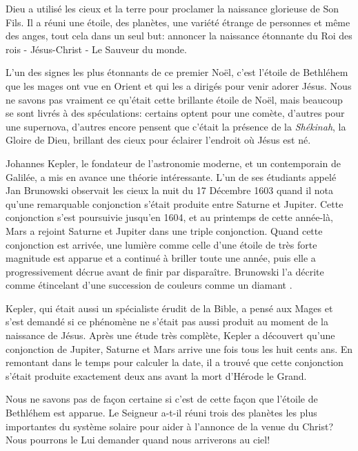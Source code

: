 


Dieu a utilisé les cieux et la terre pour proclamer la naissance glorieuse de Son Fils. Il a réuni une étoile, des planètes, une variété étrange de personnes et même des anges, tout cela dans un seul but: annoncer la naissance étonnante du Roi des rois - Jésus-Christ - Le Sauveur du monde.

L'un des signes les plus étonnants de ce premier Noël, c'est l'étoile de Bethléhem que les mages ont vue en Orient et qui les a dirigés pour venir adorer Jésus. Nous ne savons pas vraiment ce qu'était cette brillante étoile de Noël, mais beaucoup se sont livrés à des spéculations: certains optent pour une comète, d'autres pour une supernova, d'autres encore pensent que c'était la présence de la \emph{Shékinah}, la Gloire de Dieu, brillant des cieux pour éclairer l'endroit où Jésus est né.

Johannes Kepler, le fondateur de l'astronomie moderne, et un contemporain de Galilée, a mis en avance une théorie intéressante. L'un de ses étudiants appelé Jan Brunowski observait les cieux la nuit du 17 Décembre 1603 quand il nota qu'une remarquable conjonction s'était produite entre Saturne et Jupiter. Cette conjonction s'est poursuivie jusqu'en 1604, et au printemps de cette année-là, Mars a rejoint Saturne et Jupiter dans une triple conjonction. Quand cette conjonction est arrivée, une lumière comme celle d'une étoile de très forte magnitude est apparue et a continué à briller toute une année, puis elle a progressivement décrue avant de finir par disparaître. Brunowski l'a décrite comme \og étincelant d'une succession de couleurs comme un diamant \fg{}.

Kepler, qui était aussi un spécialiste érudit de la Bible, a pensé aux Mages et s'est demandé si ce phénomène ne s'était pas aussi produit au moment de la naissance de Jésus. Après une étude très complète, Kepler a découvert qu'une conjonction de Jupiter, Saturne et Mars arrive une fois tous les huit cents ans. En remontant dans le temps pour calculer la date, il a trouvé que cette conjonction s'était produite exactement deux ans avant la mort d'Hérode le Grand.

Nous ne savons pas de façon certaine si c'est de cette façon que l'étoile de Bethléhem est apparue. Le Seigneur a-t-il réuni trois des planètes les plus importantes du système solaire pour aider à l'annonce de la venue du Christ? Nous pourrons le Lui demander quand nous arriverons au ciel!



